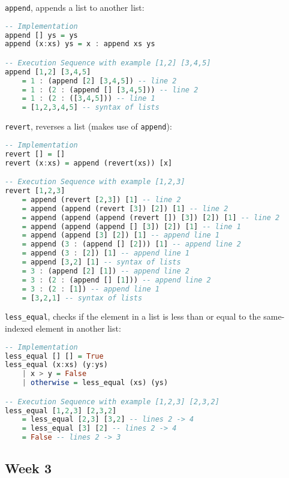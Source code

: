 \documentclass{article}
\theoremstyle{theorem}
\theoremstyle{definition}
\theoremstyle{remark}
\begin{document}
\noindent \texttt{append}, appends a list to another list:
\begin{lstlisting}[language=Haskell]
-- Implementation
append [] ys = ys
append (x:xs) ys = x : append xs ys

-- Execution Sequence with example [1,2] [3,4,5]
append [1,2] [3,4,5]
    = 1 : (append [2] [3,4,5]) -- line 2
    = 1 : (2 : (append [] [3,4,5])) -- line 2
    = 1 : (2 : ([3,4,5])) -- line 1
    = [1,2,3,4,5] -- syntax of lists
\end{lstlisting}

\noindent \texttt{revert}, reverses a list (makes use of \texttt{append}):
\begin{lstlisting}[language=Haskell]
-- Implementation
revert [] = []
revert (x:xs) = append (revert(xs)) [x]

-- Execution Sequence with example [1,2,3]
revert [1,2,3]
    = append (revert [2,3]) [1] -- line 2
    = append (append (revert [3]) [2]) [1] -- line 2
    = append (append (append (revert []) [3]) [2]) [1] -- line 2
    = append (append (append [] [3]) [2]) [1] -- line 1
    = append (append [3] [2]) [1] -- append line 1
    = append (3 : (append [] [2])) [1] -- append line 2
    = append (3 : [2]) [1] -- append line 1
    = append [3,2] [1] -- syntax of lists
    = 3 : (append [2] [1]) -- append line 2
    = 3 : (2 : (append [] [1])) -- append line 2
    = 3 : (2 : [1]) -- append line 1
    = [3,2,1] -- syntax of lists
\end{lstlisting}

\noindent \texttt{less\_equal}, checks if the element in a list is less than or equal to the same-indexed element in another list:
\begin{lstlisting}[language=Haskell]
-- Implementation
less_equal [] [] = True
less_equal (x:xs) (y:ys)
    | x > y = False
    | otherwise = less_equal (xs) (ys)

-- Execution Sequence with example [1,2,3] [2,3,2]
less_equal [1,2,3] [2,3,2]
    = less_equal [2,3] [3,2] -- lines 2 -> 4
    = less_equal [3] [2] -- lines 2 -> 4
    = False -- lines 2 -> 3
\end{lstlisting}

\newpage

\subsection{Week 3}
\end{document}
